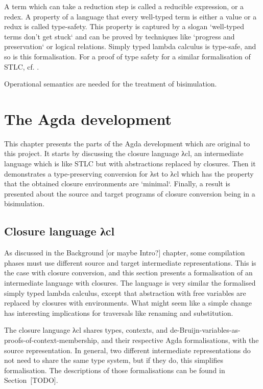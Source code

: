 \documentclass[bsc,frontabs,twoside,singlespacing,parskip,deptreport]{infthesis}
\theoremstyle{definition}
\begin{document}

A term which can take a reduction step is called a reducible
expression, or a redex. A property of a language that every well-typed
term is either a value or a redux is called type-safety. This property
is captured by a slogan `well-typed terms don't get stuck` and can be
proved by techniques like `progress and preservation` or logical
relations. Simply typed lambda calculus is type-safe, and so is this
formalisation. For a proof of type safety for a similar formalisation
of STLC, cf. \cite{DBLP:conf/sbmf/Wadler18}.

Operational semantics are needed for the treatment of bisimulation.

\chapter{The Agda development}

This chapter presents the parts of the Agda development which are
original to this project. It starts by discussing the closure language
λcl, an intermediate language which is like STLC but with abstractions
replaced by closures. Then it demonstrates a type-preserving
conversion for λst to λcl which has the property that the obtained
closure environments are `minimal`.  Finally, a result is presented
about the source and target programs of closure conversion being in a
bisimulation.

\section{Closure language λcl}
\label{sec:closure-language-cl}

As discussed in the Background [or maybe Intro?] chapter, some
compilation phases must use different source and target intermediate
representations. This is the case with closure conversion, and this
section presents a formalisation of an intermediate language with
closures. The language is very similar the formalised simply typed
lambda calculus, except that abstraction with free variables are
replaced by closures with environments. What might seem like a simple
change has interesting implications for traversals like renaming and
substitution.

The closure language λcl shares types, contexts, and
de-Bruijn-variables-as-proofs-of-context-membership, and their
respective Agda formalisations, with the source representation. In
general, two different intermediate representations do not need to
share the same type system, but if they do, this simplifies
formalisation. The descriptions of those formalisations can be found
in Section~[TODO].
\end{document}
